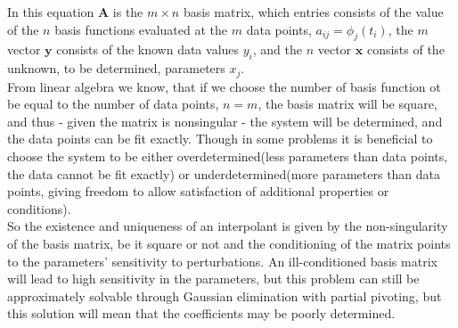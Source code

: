 \documentclass[../../CompleteThesis2/Complete_2ndDraft.tex]{subfiles}
\begin{document}
	In this equation $\boldsymbol{A}$ is the $m\times n$ basis matrix, which entries consists of the value of the $n$ basis functions evaluated at the $m$ data points, $a_{ij}=\phi_j(t_i)$, the $m$ vector $\boldsymbol{y}$ consists of the known data values $y_i$, and the $n$ vector $\boldsymbol{x}$ consists of the unknown, to be determined, parameters $x_j$.\\
	From linear algebra we know, that if we choose the number of basis function ot be equal to the number of data points, $n=m$, the basis matrix will be square, and thus - given the matrix is nonsingular - the system will be determined, and the data points can be fit exactly. Though in some problems it is beneficial to choose the system to be either overdetermined(less parameters than data points, the data cannot be fit exactly) or underdetermined(more parameters than data points, giving freedom to allow satisfaction of additional properties or conditions).\\ 
	So the existence and uniqueness of an interpolant is given by the non-singularity of the basis matrix, be it square or not and the conditioning of the matrix points to the parameters' sensitivity to perturbations. An ill-conditioned basis matrix will lead to high sensitivity in the parameters, but this problem can still be approximately solvable through Gaussian elimination with partial pivoting, but this solution will mean that the coefficients may be poorly determined.
	
\end{document}
